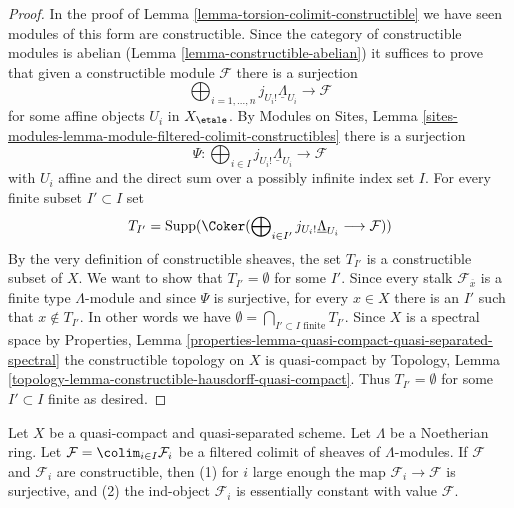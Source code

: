 \begin{proof}
In the proof of Lemma \ref{lemma-torsion-colimit-constructible}
we have seen modules of this form are constructible. Since the
category of constructible modules is abelian
(Lemma \ref{lemma-constructible-abelian})
it suffices to prove that given a constructible module $\mathcal{F}$
there is a surjection
$$
\bigoplus\nolimits_{i = 1, \ldots, n} j_{U_i!}\underline{\Lambda}_{U_i}
\longrightarrow \mathcal{F}
$$
for some affine objects $U_i$ in $X_\etale$. By
Modules on Sites, Lemma
\ref{sites-modules-lemma-module-filtered-colimit-constructibles}
there is a surjection
$$
\Psi :
\bigoplus\nolimits_{i \in I} j_{U_i!}\underline{\Lambda}_{U_i}
\longrightarrow
\mathcal{F}
$$
with $U_i$ affine and the direct sum over a possibly infinite
index set $I$. For every finite subset $I' \subset I$ set
$$
T_{I'} = \text{Supp}(\Coker(
\bigoplus\nolimits_{i \in I'} j_{U_i!}\underline{\Lambda}_{U_i}
\longrightarrow \mathcal{F}))
$$
By the very definition of constructible sheaves, the set $T_{I'}$
is a constructible subset of $X$. We want to show that $T_{I'} = \emptyset$
for some $I'$. Since every stalk $\mathcal{F}_{\overline{x}}$ is
a finite type $\Lambda$-module and since $\Psi$ is surjective, for
every $x \in X$ there is an $I'$ such that $x \not \in T_{I'}$.
In other words we have
$\emptyset = \bigcap_{I' \subset I\text{ finite}} T_{I'}$. Since
$X$ is a spectral space by Properties, Lemma
\ref{properties-lemma-quasi-compact-quasi-separated-spectral}
the constructible topology on $X$ is quasi-compact by
Topology, Lemma \ref{topology-lemma-constructible-hausdorff-quasi-compact}.
Thus $T_{I'} = \emptyset$ for some $I' \subset I$ finite
as desired.
\end{proof}

\begin{lemma}
\label{lemma-colimit-constructible}
Let $X$ be a quasi-compact and quasi-separated scheme.
Let $\Lambda$ be a Noetherian ring.
Let $\mathcal{F} = \colim_{i \in I} \mathcal{F}_i$ be a filtered colimit of
sheaves of $\Lambda$-modules. If $\mathcal{F}$ and $\mathcal{F}_i$
are constructible, then (1) for $i$ large enough the map
$\mathcal{F}_i \to \mathcal{F}$ is surjective, and (2) the ind-object
$\mathcal{F}_i$ is essentially constant with value $\mathcal{F}$.
\end{lemma}

